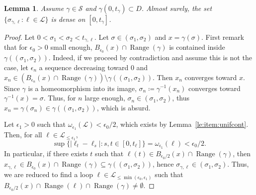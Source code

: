 \documentclass[11pt]{article}
\newtheorem{lemma}[theorem]{Lemma}
\DeclareMathOperator{\Range}{Range}
\begin{document}
\begin{lemma}
\label{le:item:dense}
  Assume $\gamma\in \mathscr{S}$ and $\gamma(0,t_\gamma)\subset D$.
  Almost surely, the set $\{ \sigma_{\gamma,\ell} : \ell\in \mathcal{L}\}$ is dense on $[0,t_\gamma]$.
\end{lemma}
\begin{proof}
  Let $0< \sigma_1< \sigma_2 < t_{\gamma,\ell}$. Let $\sigma\in(\sigma_1,\sigma_2)$ and $x=\gamma(\sigma)$.
  First remark that for $\epsilon_0>0$ small enough, $B_{\epsilon_0}(x)\cap \Range(\gamma)$ is contained inside $\gamma((\sigma_1,\sigma_2) )$. Indeed, if we proceed by contradiction and assume this is not the case, let $\epsilon_n $ a sequence decreasing toward $0$ and $x_n\in (B_{\epsilon_n}(x)\cap \Range(\gamma))\setminus \gamma((\sigma_1,\sigma_2) ) $. Then $x_n$ converges toward $x$. Since $\gamma$ is a
  homeomorphism into its image, $\sigma_n\coloneqq \gamma^{-1}(x_n)$ converges toward $\gamma^{-1}(x)=\sigma$. Thus, for $n$ large enough, $\sigma_n\in (\sigma_1,\sigma_2)$, thus $x_n=\gamma(\sigma_n)\in \gamma((\sigma_1,\sigma_2) )$,   which is absurd.

  Let $\epsilon_1>0$ such that $\omega_{\epsilon_1}(\mathcal{L})<\epsilon_0/2$, which exists by Lemma~\ref{le:item:unifcont}.
  Then, for all
  $\ell \in \mathcal{L}_{\leq \epsilon_1}$,
  \[\sup\{ |\ell_t-\ell_s|: s,t\in [0,t_\ell]\}=\omega_{\epsilon_1}(\ell)<\epsilon_0/2.\] In particular, if there exists $t$ such that $\ell(t)\in B_{\epsilon_0/2}(x)\cap \Range(\gamma)$, then $x_{\gamma,\ell}\in  B_{\epsilon_0}(x)\cap \Range(\gamma)\subseteq  \gamma((\sigma_1,\sigma_2) )$, hence
  $\sigma_{\gamma,\ell}\in   (\sigma_1,\sigma_2)$.
  Thus, we are reduced to find a loop $\ell \in \mathcal{L}_{\leq \min(\epsilon_0,\epsilon_1)}$ such that
  $B_{\epsilon_0/2}(x)\cap \Range(\ell) \cap \Range(\gamma)\neq \emptyset $.


\end{proof}
\end{document}
